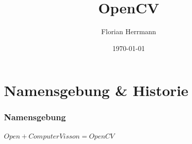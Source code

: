 \documentclass{beamer}
\begin{document}
\title{OpenCV}   
\author{Florian Herrmann} 
\date{\today}

\begin{frame}
\titlepage
\end{frame}

\section{Namensgebung \& Historie}
\begin{frame} \frametitle{Namensgebung}
	$Open + Computer Visson = OpenCV$
	
\end{frame}
\end{document}
